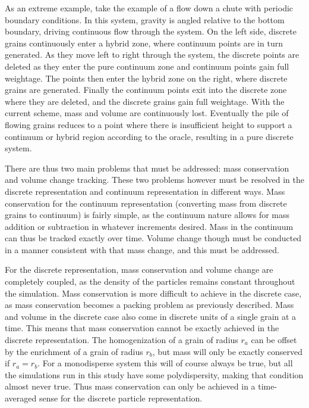 As an extreme example, take the example of a flow down a chute with periodic boundary conditions. In this system, gravity is angled relative to the bottom boundary, driving continuous flow through the system. On the left side, discrete grains continuously enter a hybrid zone, where continuum points are in turn generated. As they move left to right through the system, the discrete points are deleted as they enter the pure continuum zone and continuum points gain full weightage. The points then enter the hybrid zone on the right, where discrete grains are generated. Finally the continuum points exit into the discrete zone where they are deleted, and the discrete grains gain full weightage. With the current scheme, mass and volume are continuously lost. Eventually the pile of flowing grains reduces to a point where there is insufficient height to support a continuum or hybrid region according to the oracle, resulting in a pure discrete system.

There are thus two main problems that must be addressed: mass conservation and volume change tracking. These two problems however must be resolved in the discrete representation and continuum representation in different ways. Mass conservation for the continuum representation (converting mass from discrete grains to continuum) is fairly simple, as the continuum nature allows for mass addition or subtraction in whatever increments desired. Mass in the continuum can thus be tracked exactly over time. Volume change though must be conducted in a manner consistent with that mass change, and this must be addressed. 

For the discrete representation, mass conservation and volume change are completely coupled, as the density of the particles remains constant throughout the simulation. Mass conservation is more difficult to achieve in the discrete case, as mass conservation becomes a packing problem as previously described. Mass and volume in the discrete case also come in discrete units of a single grain at a time. This means that mass conservation cannot be exactly achieved in the discrete representation. The homogenization of a grain of radius $r_a$ can be offset by the enrichment of a grain of radius $r_b$, but mass will only be exactly conserved if $r_a = r_b$. For a monodisperse system this will of course always be true, but all the simulations run in this study have some polydispersity, making that condition almost never true. Thus mass conservation can only be achieved in a time-averaged sense for the discrete particle representation.


